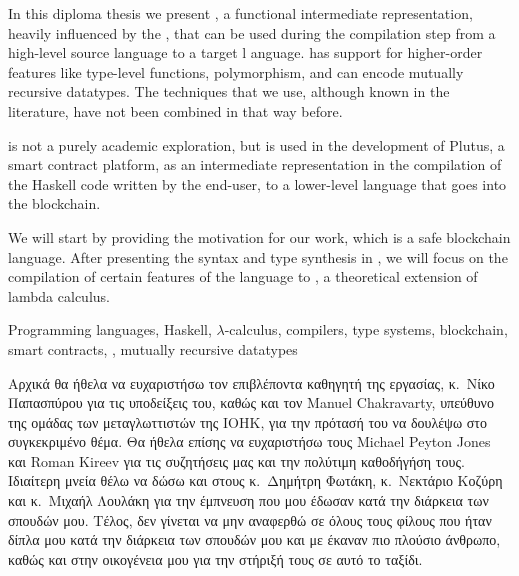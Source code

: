 \documentclass[diploma]{softlab-thesis}
\begin{document}

\begin{abstracten}%
In this diploma thesis we present \FIR{}, a functional intermediate representation, heavily influenced
by the \FOM{}, that can be used during the compilation step from a high-level source language to a target l
anguage. \FIR{} has support for higher-order features like type-level functions, polymorphism, and can encode
mutually recursive datatypes. The techniques that we use, although known in the literature, have
not been combined in that way before.

\FIR{} is not a purely academic exploration, but is used in the development of Plutus, a smart contract
platform, as an intermediate representation in the compilation of the Haskell code written by the end-user,
to a lower-level language that goes into the blockchain.

We will start by providing the motivation for our work, which is a safe blockchain language. After presenting the syntax and type synthesis in \FIR{}, we will focus on the compilation of certain features
of the language to \FOMF, a theoretical extension of lambda calculus.

\begin{keywordsen}
Programming languages, Haskell, $\lambda$-calculus, compilers, type systems, blockchain, smart contracts, 
\FOM{}, mutually recursive datatypes
\end{keywordsen}
\end{abstracten}


\begin{acknowledgementsgr}
Αρχικά θα ήθελα να ευχαριστήσω τον επιβλέποντα καθηγητή της εργασίας, κ.\ Νίκο Παπασπύρου για τις υποδείξεις του, καθώς και τον Manuel Chakravarty, υπεύθυνο της ομάδας των μεταγλωττιστών της IOHK, για την πρότασή του να δουλέψω στο συγκεκριμένο θέμα. Θα ήθελα επίσης να ευχαριστήσω τους Michael Peyton Jones και Roman Kireev για τις συζητήσεις μας και την πολύτιμη καθοδήγήση τους. Ιδιαίτερη μνεία
θέλω να δώσω και στους κ.\ Δημήτρη Φωτάκη, κ.\ Νεκτάριο Κοζύρη και κ.\ Μιχαήλ Λουλάκη για την έμπνευση
που μου έδωσαν κατά την διάρκεια των σπουδών μου.
Τέλος, δεν γίνεται να μην αναφερθώ σε όλους τους φίλους που ήταν δίπλα μου κατά την διάρκεια των σπουδών μου και με έκαναν πιο πλούσιο άνθρωπο, καθώς και στην οικογένεια μου για την στήριξή τους σε αυτό το ταξίδι.
\end{acknowledgementsgr}
\end{document}
